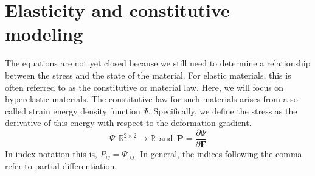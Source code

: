 \section*{Elasticity and constitutive modeling}
The equations are not yet closed because we still need to determine a relationship between the stress and the state of the material. For elastic materials, this is often referred to as the constitutive or material law. Here, we will focus on hyperelastic materials. The constitutive law for such materials arises from a so called strain energy density function $\Psi$. Specifically, we define the stress as the derivative of this energy with respect to the deformation gradient.
$$
\Psi:\mathbb{R}^{2\times2}\rightarrow\mathbb{R} \ \ \textrm{and} \ \ \mathbf{P}=\frac{\partial\Psi}{\partial\mathbf{F}}
$$
In index notation this is, $P_{ij}=\Psi_{,ij}$. In general, the indices following the comma refer to partial differentiation.

